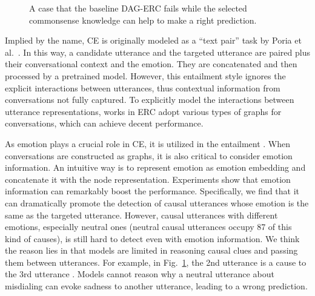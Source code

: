 \documentclass{article}
\begin{document}
\begin{figure}
    \centering
    \caption{A case that the baseline DAG-ERC fails while the selected commonsense knowledge can help to make a right prediction. }
    \label{case}
    \vspace{-0.2cm}
\end{figure}

Implied by the name, CE is originally modeled as a ``text pair'' task by Poria et al.~. In this way, a candidate utterance and the targeted utterance are paired plus their conversational context and the emotion. They are concatenated and then processed by a pretrained model. However, this entailment style ignores the explicit interactions between utterances, thus contextual information from conversations not fully captured. To explicitly model the interactions between utterance representations, works \cite{DialogueGCN,DAG} in ERC adopt various types of graphs for conversations, which can achieve decent performance. 

As emotion plays a crucial role in CE, it is utilized in the entailment \cite{RECCON}. When conversations are constructed as graphs, it is also critical to consider emotion information. An intuitive way is to represent emotion as emotion embedding \cite{Liang} and concatenate it with the node representation. Experiments show that emotion information can remarkably boost the performance. Specifically, we find that it can dramatically promote the detection of causal utterances whose emotion is the same as the targeted utterance. However, causal utterances with different emotions, especially neutral ones (neutral causal utterances occupy 87 of this kind of causes), is still hard to detect even with emotion information. We think the reason lies in that models are limited in reasoning causal clues and passing them between utterances. For example, in Fig.~\ref{case}, the 2nd utterance  is a cause to the 3rd utterance . Models cannot reason why a neutral utterance about misdialing can evoke sadness to another utterance, leading to a wrong prediction. 
\end{document}
